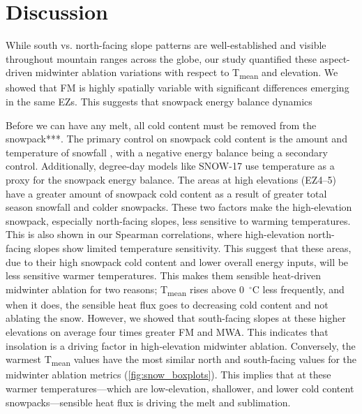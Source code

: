 \hypertarget{ch2-discussion}{\section{Discussion}\label{ch2-discussion}}


While south vs. north-facing slope patterns are well-established and visible throughout mountain ranges across the globe, our study quantified these aspect-driven midwinter ablation variations with respect to T\textsubscript{mean} and elevation. We showed that FM is highly spatially variable with significant differences emerging in the same EZs. This suggests that snowpack energy balance dynamics 

Before we can have any melt, all cold content must be removed from the snowpack***. The primary control on snowpack cold content is the amount and temperature of snowfall \citep{jenningsObservationsSimulationsSeasonal2018}, with a negative energy balance being a secondary control. Additionally, degree-day models like SNOW-17 use temperature as a proxy for the snowpack energy balance. The areas at high elevations (EZ4--5) have a greater amount of snowpack cold content as a result of greater total season snowfall and colder snowpacks. These two factors make the high-elevation snowpack, especially north-facing slopes, less sensitive to warming temperatures. This is also shown in our Spearman correlations, where high-elevation north-facing slopes show limited temperature sensitivity. This suggest that these areas, due to their high snowpack cold content and lower overall energy inputs, will be less sensitive warmer temperatures. This makes them sensible heat-driven midwinter ablation for two reasons; T\textsubscript{mean} rises above 0~$^{\circ}$C less frequently, and when it does, the sensible heat flux goes to decreasing cold content and not ablating the snow. However, we showed that south-facing slopes at these higher elevations on average four times greater FM and MWA. This indicates that insolation is a driving factor in high-elevation midwinter ablation. Conversely, the warmest T\textsubscript{mean} values have the most similar north and south-facing values for the midwinter ablation metrics (\ref{fig:snow_boxplots}). This implies that at these warmer temperatures---which are low-elevation, shallower, and lower cold content snowpacks---sensible heat flux is driving the melt and sublimation. 

